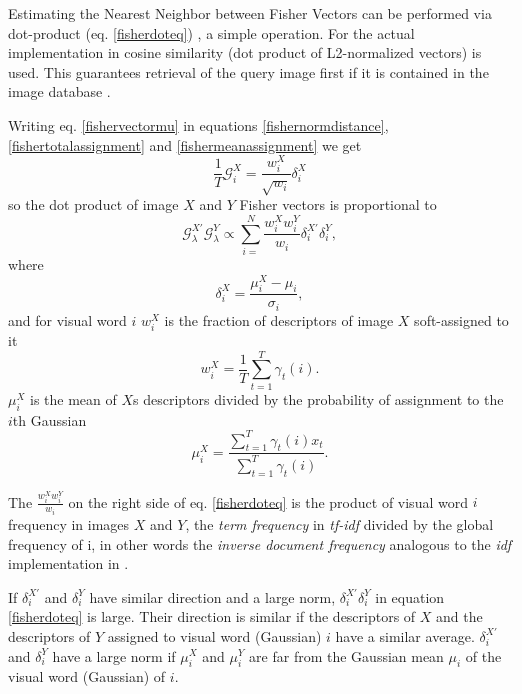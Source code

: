 \documentclass[english,12pt,a4paper,pdftex,elec,utf8, table]{aaltothesis}
\begin{document}
Estimating the Nearest Neighbor between Fisher Vectors can be performed via dot-product (eq. \ref{fisherdoteq}) \cite{Perronnin2010a}, a simple operation. For the actual implementation in \cite{Perronnin2010a} cosine similarity (dot product of L2-normalized vectors) is used. This guarantees retrieval of the query image first if it is contained in the image database \cite{Perronnin2010a}.

Writing eq. \ref{fishervectormu} in equations \ref{fishernormdistance}, \ref{fishertotalassignment} and \ref{fishermeanassignment} we get
\begin{equation}\label{fisherrewrite}
\frac{1}{T}\mathcal{G}_i^X=\frac{w_i^X}{\sqrt{w_i}}\delta_i^X
\end{equation}
so the dot product of image $X$ and $Y$ Fisher vectors is proportional to
\begin{equation}\label{fisherdoteq}
\mathcal{G}_\lambda^{X'}\mathcal{G}_\lambda^Y \propto \sum_{i=}^N\frac{w_i^Xw_i^Y}{w_i}\delta_i^{X'}\delta_i^Y,
\end{equation}
where
\begin{equation}\label{fishernormdistance}
\delta_i^X = \frac{\mu_i^X - \mu_i}{\sigma_i},
\end{equation}
and for visual word $i$ $w_i^X$ is the fraction of descriptors of image $X$ soft-assigned to it
\begin{equation}\label{fishertotalassignment}
w_i^X = \frac{1}{T}\sum_{t=1}^T\gamma_t(i).
  \end{equation}
$\mu_i^X$ is the mean of $X$s descriptors divided by the probability of assignment to the $i$th Gaussian
\begin{equation}\label{fishermeanassignment}
\mu_i^X=\frac{\sum_{t=1}^T\gamma_t(i)x_t}{\sum_{t=1}^T\gamma_t(i)}.
\end{equation}

The $\frac{w_i^Xw_i^Y}{w_i}$ on the right side of eq. \ref{fisherdoteq} is the product of visual word $i$ frequency in images $X$ and $Y$, the \emph{term frequency} in \emph{tf-idf} divided by the global frequency of i, in other words the \emph{inverse document frequency} analogous to the \emph{idf} implementation in \cite{Sivic2003}.

If $\delta_i^{X'}$ and $\delta_i^{Y}$ have similar direction and a large norm, $\delta_i^{X'}\delta_i^{Y}$ in equation \ref{fisherdoteq} is large. Their direction is similar if the descriptors of $X$ and the descriptors of $Y$ assigned to visual word (Gaussian) $i$ have a similar average. $\delta_i^{X'}$ and $\delta_i^{Y}$ have a large norm if $\mu_i^X$ and $\mu_i^Y$ are far from the Gaussian mean $\mu_i$ of the visual word (Gaussian) of $i$. \cite{Perronnin2010a}
\end{document}
